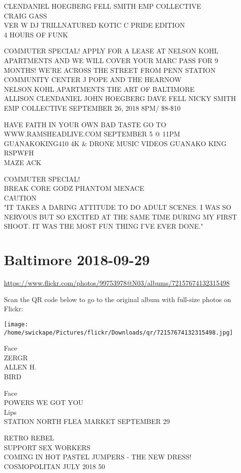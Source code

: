\documentclass[10pt,letterpaper]{article}
\begin{document}
CLENDANIEL HOEGBERG FELL SMITH EMP COLLECTIVE\\
CRAIG GASS\\
VER W DJ TRILLNATURED KOTIC C PRIDE EDITION\\
4 HOURS OF FUNK

COMMUTER SPECIAL!  APPLY FOR A LEASE AT NELSON KOHL APARTMENTS AND WE WILL COVER YOUR MARC PASS FOR 9 MONTHS!  WE'RE ACROSS THE STREET FROM PENN STATION\\
COMMUNITY CENTER J POPE AND THE HEARNOW\\
NELSON KOHL APARTMENTS THE ART OF BALTIMORE\\
ALLISON CLENDANIEL JOHN HOEGBERG DAVE FELL NICKY SMITH EMP COLLECTIVE SEPTEMBER 26, 2018 8PM/ \$8{-}\$10

HAVE FAITH IN YOUR OWN BAD TASTE GO TO WWW.RAMSHEADLIVE.COM SEPTEMBER 5 @ 11PM\\
GUANAKOKING410 4K \& DRONE MUSIC VIDEOS GUANAKO KING\\
RSPWFH\\
MAZE ACK

COMMUTER SPECIAL!\\
BREAK CORE GODZ PHANTOM MENACE\\
CAUTION\\
"IT TAKES A DARING ATTITUDE TO DO ADULT SCENES.  I WAS SO NERVOUS BUT SO EXCITED AT THE SAME TIME DURING MY FIRST SHOOT.  IT WAS THE MOST FUN THING I'VE EVER DONE."


\section*{Baltimore 2018-09-29}

\url{https://www.flickr.com/photos/99753978@N03/albums/72157674132315498}

Scan the QR code below to go to the original album with full-size photos on Flickr:

\texttt{[image: /home/swickape/Pictures/flickr/Downloads/qr/72157674132315498.jpg]}


Face\\
ZERGR\\
ALLEN H.\\
BIRD

Face\\
POWERS WE GOT YOU\\
Lips\\
STATION NORTH FLEA MARKET SEPTEMBER 29

RETRO REBEL\\
SUPPORT SEX WORKERS\\
COMING IN HOT PASTEL JUMPERS {-} THE NEW DRESS!\\
COSMOPOLITAN JULY 2018 50
\end{document}

